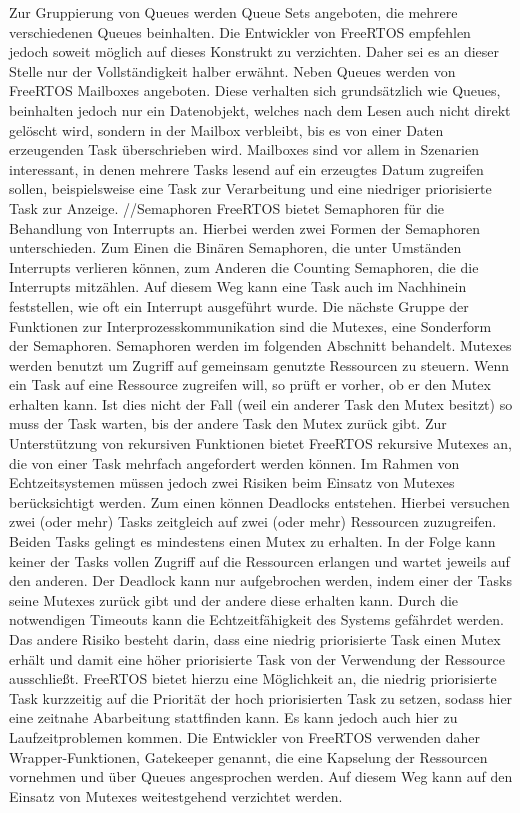 Zur Gruppierung von Queues werden Queue Sets angeboten, die mehrere verschiedenen Queues beinhalten. Die Entwickler von FreeRTOS empfehlen jedoch soweit möglich auf dieses Konstrukt zu verzichten. Daher sei es an dieser Stelle nur der Vollständigkeit halber erwähnt. Neben Queues werden von FreeRTOS Mailboxes angeboten. Diese verhalten sich grundsätzlich wie Queues, beinhalten jedoch nur ein Datenobjekt, welches nach dem Lesen auch nicht direkt gelöscht wird, sondern in der Mailbox verbleibt, bis es von einer Daten erzeugenden Task überschrieben wird. Mailboxes sind vor allem in Szenarien interessant, in denen mehrere Tasks lesend auf ein erzeugtes Datum zugreifen sollen, beispielsweise eine Task zur Verarbeitung und eine niedriger priorisierte Task zur Anzeige.
//Semaphoren
FreeRTOS bietet Semaphoren für die Behandlung von Interrupts an. Hierbei werden zwei Formen der Semaphoren unterschieden. Zum Einen die Binären Semaphoren, die unter Umständen Interrupts verlieren können, zum Anderen die Counting Semaphoren, die die Interrupts mitzählen. Auf diesem Weg kann eine Task auch im Nachhinein feststellen, wie oft ein Interrupt ausgeführt wurde.
Die nächste Gruppe der Funktionen zur Interprozesskommunikation sind die Mutexes, eine Sonderform der Semaphoren. Semaphoren werden im folgenden Abschnitt behandelt. Mutexes werden benutzt um Zugriff auf gemeinsam genutzte Ressourcen zu steuern. Wenn ein Task auf eine Ressource zugreifen will, so prüft er vorher, ob er den Mutex erhalten kann. Ist dies nicht der Fall (weil ein anderer Task den Mutex besitzt) so muss der Task warten, bis der andere Task den Mutex zurück gibt. Zur Unterstützung von rekursiven Funktionen bietet FreeRTOS rekursive Mutexes an, die von einer Task mehrfach angefordert werden können.
Im Rahmen von Echtzeitsystemen müssen jedoch zwei Risiken beim Einsatz von Mutexes berücksichtigt werden. Zum einen können Deadlocks entstehen. Hierbei versuchen zwei (oder mehr) Tasks zeitgleich auf zwei (oder mehr) Ressourcen zuzugreifen. Beiden Tasks gelingt es mindestens einen Mutex zu erhalten. In der Folge kann keiner der Tasks vollen Zugriff auf die Ressourcen erlangen und wartet jeweils auf den anderen. Der Deadlock kann nur aufgebrochen werden, indem einer der Tasks seine Mutexes zurück gibt und der andere diese erhalten kann. Durch die notwendigen Timeouts kann die Echtzeitfähigkeit des Systems gefährdet werden.
Das andere Risiko besteht darin, dass eine niedrig priorisierte Task einen Mutex erhält und damit eine höher priorisierte Task von der Verwendung der Ressource ausschließt. FreeRTOS bietet hierzu eine Möglichkeit an, die niedrig priorisierte Task kurzzeitig auf die Priorität der hoch priorisierten Task zu setzen, sodass hier eine zeitnahe Abarbeitung stattfinden kann. Es kann jedoch auch hier zu Laufzeitproblemen kommen. Die Entwickler von FreeRTOS verwenden daher Wrapper-Funktionen, Gatekeeper genannt, die eine Kapselung der Ressourcen vornehmen und über Queues angesprochen werden. Auf diesem Weg kann auf den Einsatz von Mutexes weitestgehend verzichtet werden.
